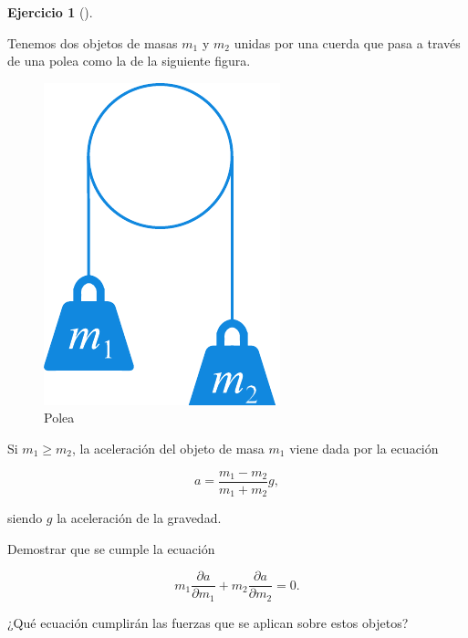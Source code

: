 \documentclass[
  a4paper,
]{scrreport}
\theoremstyle{definition}
\newtheorem{exercise}{Ejercicio}[chapter]
\theoremstyle{remark}
\begin{document}
\begin{exercise}[]\protect\hypertarget{exr-polea}{}\label{exr-polea}

Tenemos dos objetos de masas \(m_1\) y \(m_2\) unidas por una cuerda que
pasa a través de una polea como la de la siguiente figura.

\begin{figure}[H]

{\centering \includegraphics{img/derivadas-funciones-varias-variables/polea.pdf}

}

\caption{Polea}

\end{figure}%

Si \(m_1\geq m_2\), la aceleración del objeto de masa \(m_1\) viene dada
por la ecuación

\[
a=\frac{m_1-m_2}{m_1+m_2}g,
\]

siendo \(g\) la aceleración de la gravedad.

Demostrar que se cumple la ecuación

\[
m_1\frac{\partial a}{\partial m_1}+m_2\frac{\partial a}{\partial m_2}=0.
\]

¿Qué ecuación cumplirán las fuerzas que se aplican sobre estos objetos?

\end{exercise}
\end{document}
